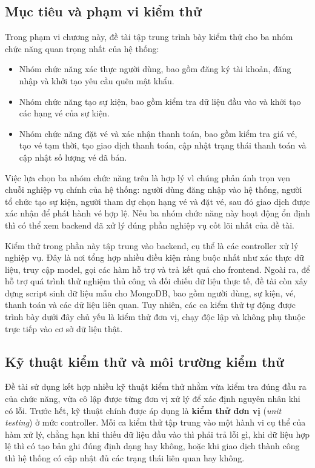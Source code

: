 \documentclass[../DoAn.tex]{subfiles}
\begin{document}
\subsection{Mục tiêu và phạm vi kiểm thử}
Trong phạm vi chương này, đề tài tập trung trình bày kiểm thử cho ba nhóm chức năng quan trọng nhất của hệ thống:

\begin{itemize}
    \item Nhóm chức năng xác thực người dùng, bao gồm đăng ký tài khoản, đăng nhập và khởi tạo yêu cầu quên mật khẩu.
    \item Nhóm chức năng tạo sự kiện, bao gồm kiểm tra dữ liệu đầu vào và khởi tạo các hạng vé của sự kiện.
    \item Nhóm chức năng đặt vé và xác nhận thanh toán, bao gồm kiểm tra giá vé, tạo vé tạm thời, tạo giao dịch thanh toán, cập nhật trạng thái thanh toán và cập nhật số lượng vé đã bán.
\end{itemize}

Việc lựa chọn ba nhóm chức năng trên là hợp lý vì chúng phản ánh trọn vẹn chuỗi nghiệp vụ chính của hệ thống: người dùng đăng nhập vào hệ thống, người tổ chức tạo sự kiện, người tham dự chọn hạng vé và đặt vé, sau đó giao dịch được xác nhận để phát hành vé hợp lệ. Nếu ba nhóm chức năng này hoạt động ổn định thì có thể xem backend đã xử lý đúng phần nghiệp vụ cốt lõi nhất của đề tài.

Kiểm thử trong phần này tập trung vào backend, cụ thể là các controller xử lý nghiệp vụ. Đây là nơi tổng hợp nhiều điều kiện ràng buộc nhất như xác thực dữ liệu, truy cập model, gọi các hàm hỗ trợ và trả kết quả cho frontend. Ngoài ra, để hỗ trợ quá trình thử nghiệm thủ công và đối chiếu dữ liệu thực tế, đề tài còn xây dựng script sinh dữ liệu mẫu cho MongoDB, bao gồm người dùng, sự kiện, vé, thanh toán và các dữ liệu liên quan. Tuy nhiên, các ca kiểm thử tự động được trình bày dưới đây chủ yếu là kiểm thử đơn vị, chạy độc lập và không phụ thuộc trực tiếp vào cơ sở dữ liệu thật.

\subsection{Kỹ thuật kiểm thử và môi trường kiểm thử}
Đề tài sử dụng kết hợp nhiều kỹ thuật kiểm thử nhằm vừa kiểm tra đúng đầu ra của chức năng, vừa cô lập được từng đơn vị xử lý để xác định nguyên nhân khi có lỗi. Trước hết, kỹ thuật chính được áp dụng là \textbf{kiểm thử đơn vị} (\textit{unit testing}) ở mức controller. Mỗi ca kiểm thử tập trung vào một hành vi cụ thể của hàm xử lý, chẳng hạn khi thiếu dữ liệu đầu vào thì phải trả lỗi gì, khi dữ liệu hợp lệ thì có tạo bản ghi đúng định dạng hay không, hoặc khi giao dịch thành công thì hệ thống có cập nhật đủ các trạng thái liên quan hay không.
\end{document}
